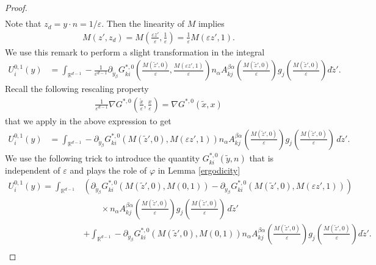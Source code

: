 \documentclass[11pt, reqno]{amsart}
\theoremstyle{definition}
\theoremstyle{remark}
\numberwithin{equation}{section}
\begin{document}
\begin{proof}[Proof]
\begin{align*}
		\end{align*}
		Note that $z_d = y\cdot n = 1/ \varepsilon$. Then the linearity of $M$ implies 
		\begin{align*}
			M(z',z_d)= M \left(\frac{\varepsilon z'}{\varepsilon },\frac{1}{\varepsilon}\right)= \frac{1}{\varepsilon} M (\varepsilon z',1).
		\end{align*}
		We use this remark to perform a slight transformation  in the integral
		\begin{align*}
			U^{0,1}_i(y)	&=\int_{\mathbb{R}^{d-1}} -\frac{1}{\varepsilon^{d-1} } \partial_{\tilde{y}_\beta} G^{*,0}_{ki} \left(\frac{M(\tilde{z}',0)}{\varepsilon },\frac{M (\varepsilon z',1)}{\varepsilon} \right) n_\alpha A^{\beta\alpha}_{kj} \left(\frac{M(\tilde{z}',0)}{\varepsilon }\right) g_j\left(\frac{M(\tilde{z}',0)}{\varepsilon }\right)d\tilde{z}'.
		\end{align*}
		Recall the following rescaling property
		\begin{align*}
			\frac{1}{\varepsilon^{d-1} } \nabla G^{*,0}\left(\frac{\tilde{x}}{\varepsilon },\frac{x}{\varepsilon} \right) =   \nabla G^{*,0}\left(\tilde{x},x\right)
		\end{align*}
		that we apply in the above expression to get 
		\begin{align*}
			U^{0,1}_i(y)
			&=\int_{\mathbb{R}^{d-1}} -\partial_{\tilde{y}_\beta} G^{*,0}_{ki}\left(M(\tilde{z}',0),M (\varepsilon z',1) \right) n_\alpha A^{\beta\alpha}_{kj} \left(\frac{M(\tilde{z}',0)}{\varepsilon }\right) g_j\left(\frac{M(\tilde{z}',0)}{\varepsilon }\right) \,d\tilde{z}'.  
		\end{align*}
		We  use the following trick to introduce the quantity $ G^{*,0}_{ki}\left(\tilde{y},n \right)$ that is independent of $\varepsilon$ and plays the role of $\varphi$ in Lemma \ref{ergodicity}
		\begin{align}\label{addrmove}
			U^{0,1}_i(y)=
			\int_{\mathbb{R}^{d-1}}\!\! &\left( \partial_{\tilde{y}_\beta} G^{*,0}_{ki}\left(M(\tilde{z}',0),M (0,1) \right) 
			- \partial_{\tilde{y}_\beta} G^{*,0}_{ki}\left(M(\tilde{z}',0),M (\varepsilon z',1) \right) \right)\\
			&\qquad \times n_\alpha A^{\beta\alpha}_{kj} \left(\frac{M(\tilde{z}',0)}{\varepsilon }\right) g_j\left(\frac{M(\tilde{z}',0)}{\varepsilon }\right)  \,d\tilde{z}' \nonumber \\
			&+\int_{\mathbb{R}^{d-1}} \!\! - \partial_{\tilde{y}_\beta} G^{*,0}_{ki}\left(M(\tilde{z}',0),M (0,1) \right) n_\alpha A^{\beta\alpha}_{kj} \left(\frac{M(\tilde{z}',0)}{\varepsilon }\right) g_j \! \left(\!\!\frac{M(\tilde{z}',0)}{\varepsilon }\!\right)\! d\tilde{z}'  .  \nonumber\\ \nonumber
		\end{align}
		

\end{proof}
\end{document}
